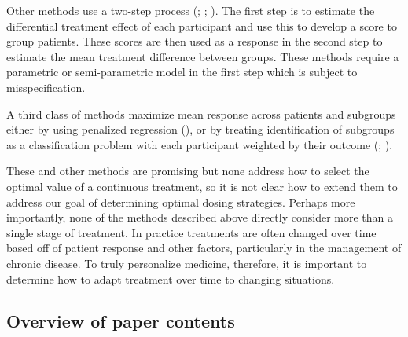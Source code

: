 \documentclass[12pt]{article}
\begin{document}
Other methods use a two-step process (\cite{Cai2011}; \cite{Zhao2013}; \cite{Foster2011}). The first step is to estimate the differential treatment effect of each participant and use this to develop a score to group patients. These scores are then used as a response in the second step to estimate the mean treatment difference between groups. These methods require a parametric or semi-parametric model in the first step which is subject to misspecification. 

%
%
%

A third class of methods maximize mean response across patients and subgroups either by using penalized regression (\cite{Qian2011}), or by treating identification of subgroups as a classification problem with each participant weighted by their outcome (\cite{Zhao2012}; \cite{Zhang2012}).

These and other methods are promising but none address how to select the optimal value of a continuous treatment, so it is not clear how to extend them to address our goal of determining optimal dosing strategies. Perhaps more importantly, none of the methods described above directly consider more than a single stage of treatment. In practice treatments are often changed over time based off of patient response and other factors, particularly in the management of chronic disease. To truly personalize medicine, therefore, it is important to determine how to adapt treatment over time to changing situations. 





\subsection{Overview of paper contents} %
\label{sub:overview_of_contents}
\end{document}
